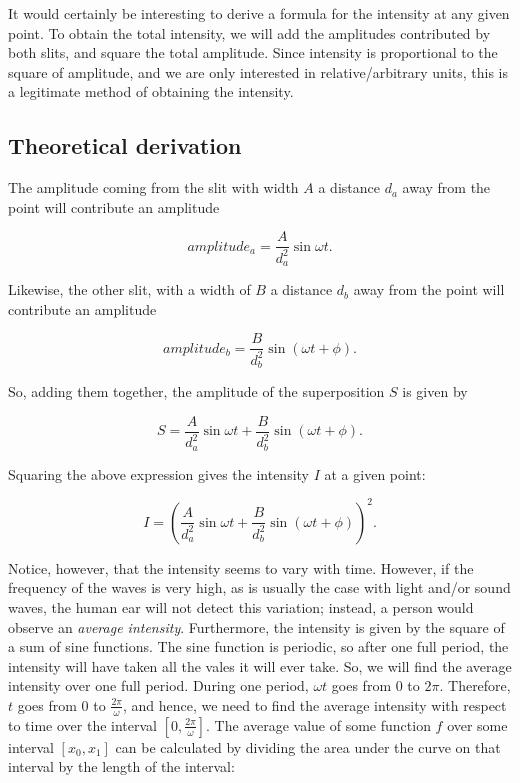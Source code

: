 \documentclass{paper}
\begin{document}
It would certainly be interesting to derive a formula for the intensity at any given point.
To obtain the total intensity, we will add the amplitudes contributed by
both slits, and square the total amplitude. Since intensity is proportional to the
square of amplitude, and we are only interested in relative/arbitrary units, this is a
legitimate method of obtaining the intensity.
            
\subsection{Theoretical derivation}
            
The amplitude coming from the slit with width $A$ a distance $d_a$ away from the point
will contribute an amplitude
            
\begin{equation*}
    amplitude_{a} = \frac{A}{d_{a}^{2}}\sin{\omega{}t}.
\end{equation*}
            
Likewise, the other slit, with a width of $B$ a distance $d_{b}$ away from the point
will contribute an amplitude 
            
\begin{equation*}
    amplitude_{b} = \frac{B}{d_{b}^{2}}\sin(\omega{}t + \phi).
\end{equation*}
            
So, adding them together, the amplitude of the superposition $S$ is given by
            
\begin{equation*}
    S = \frac{A}{d_{a}^{2}}\sin{\omega{}t} + \frac{B}{d_{b}^{2}}\sin(\omega{}t + \phi).
\end{equation*}
            
Squaring the above expression gives the intensity $I$ at a given point:
            
\begin{equation}
    \label{eq:superposition-intensity}
    I = \left(\frac{A}{d_{a}^{2}}\sin{\omega{}t} + \frac{B}{d_{b}^{2}}\sin(\omega{}t + \phi)\right)^{2}.
\end{equation}

Notice, however, that the intensity seems to vary with time. However, if the frequency of the waves is
very high, as is usually the case with light and/or sound waves, the human ear will not
detect this variation; instead, a person would observe an \textit{average intensity}. Furthermore,
the intensity is given by the square of a sum of sine functions. The sine function is periodic,
so after one full period, the intensity will have taken all the vales it will ever take. So, we will find the average intensity
over one full period. During one period, $\omega{}t$ goes from $0$ to $2\pi$.
Therefore, $t$ goes from $0$ to $\frac{2\pi}{\omega}$, and hence, we need to find the average
intensity with respect to time over the interval $\left[0, \frac{2\pi}{\omega}\right]$. The average
value of some function $f$ over some interval $[x_{0}, x_{1}]$ can be calculated by dividing the
area under the curve on that interval by the length of the interval:
\end{document}
